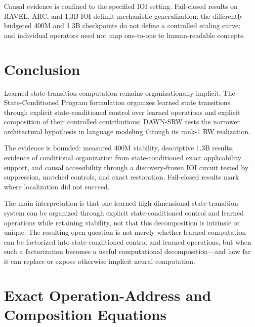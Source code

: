 \documentclass{article}
\newcommand{\DAWN}{DAWN-SRW}
\begin{document}
Causal evidence is confined to the specified IOI setting. Fail-closed results on
RAVEL, ARC, and 1.3B IOI delimit mechanistic generalization; the differently
budgeted 400M and 1.3B checkpoints do not define a controlled scaling curve; and
individual operators need not map one-to-one to human-readable concepts.

\section{Conclusion}

Learned state-transition computation remains organizationally implicit. The
State-Conditioned Program formulation organizes learned state transitions
through explicit state-conditioned control over learned operations and explicit
composition of their controlled contributions; \DAWN{} tests the narrower
architectural hypothesis in language modeling through its rank-1 RW
realization.

The evidence is bounded: measured 400M viability, descriptive 1.3B results,
evidence of conditional organization from state-conditioned exact applicability
support, and causal accessibility through a
discovery-frozen IOI circuit tested by suppression, matched controls, and exact
restoration. Fail-closed results mark where localization did not succeed.

The main interpretation is that one learned high-dimensional state-transition
system can be organized through explicit state-conditioned control and learned
operations while retaining viability, not that this decomposition is intrinsic
or unique. The
resulting open question is not merely whether learned computation can be
factorized into state-conditioned control and learned operations, but when such
a factorization becomes
a useful computational decomposition---and how far it can replace or expose
otherwise implicit neural computation.

\clearpage
\appendix

\section{Exact Operation-Address and Composition Equations}
\label{app:equations}
\end{document}
